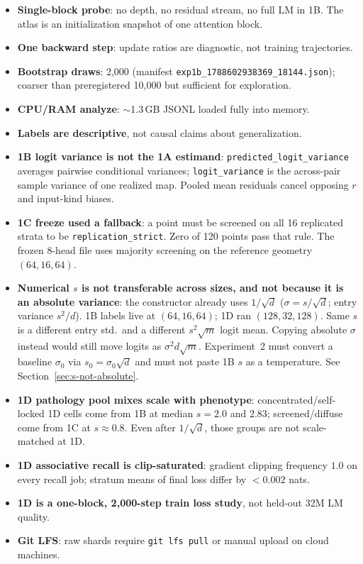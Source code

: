 \documentclass[11pt,a4paper]{report}
\begin{document}
\begin{itemize}[leftmargin=*]
  \item \textbf{Single-block probe}: no depth, no residual stream, no full LM in 1B. The atlas is an initialization snapshot of one attention block.
  \item \textbf{One backward step}: update ratios are diagnostic, not training trajectories.
  \item \textbf{Bootstrap draws}: 2{,}000 (manifest \texttt{exp1b\_1788602938369\_18144.json}); coarser than preregistered 10{,}000 but sufficient for exploration.
  \item \textbf{CPU/RAM analyze}: $\sim$1.3\,GB JSONL loaded fully into memory.
  \item \textbf{Labels are descriptive}, not causal claims about generalization.
  \item \textbf{1B logit variance is not the 1A estimand}: \texttt{predicted\_logit\_variance} averages pairwise conditional variances; \texttt{logit\_variance} is the across-pair sample variance of one realized map. Pooled mean residuals cancel opposing $r$ and input-kind biases.
  \item \textbf{1C freeze used a fallback}: a point must be screened on all 16 replicated strata to be \texttt{replication\_strict}. Zero of 120 points pass that rule. The frozen 8-head file uses majority screening on the reference geometry $(64,16,64)$.
  \item \textbf{Numerical $s$ is not transferable across sizes, and not because it is an absolute variance}: the constructor already uses $1/\sqrt{d}$ ($\sigma=s/\sqrt{d}$; entry variance $s^2/d$). 1B labels live at $(64,16,64)$; 1D ran $(128,32,128)$. Same $s$ is a different entry std.\ and a different $s^2\sqrt{m}$ logit mean. Copying absolute $\sigma$ instead would still move logits as $\sigma^2 d\sqrt{m}$. Experiment~2 must convert a baseline $\sigma_0$ via $s_0=\sigma_0\sqrt{d}$ and must not paste 1B $s$ as a temperature. See Section~\ref{sec:s-not-absolute}.
  \item \textbf{1D pathology pool mixes scale with phenotype}: concentrated/self-locked 1D cells come from 1B at median $s=2.0$ and $2.83$; screened/diffuse come from 1C at $s\approx 0.8$. Even after $1/\sqrt{d}$, those groups are not scale-matched at 1D.
  \item \textbf{1D associative recall is clip-saturated}: gradient clipping frequency $1.0$ on every recall job; stratum means of final loss differ by $<0.002$ nats.
  \item \textbf{1D is a one-block, 2{,}000-step train loss study}, not held-out 32M LM quality.
  \item \textbf{Git LFS}: raw shards require \texttt{git lfs pull} or manual upload on cloud machines.
\end{itemize}
\end{document}
